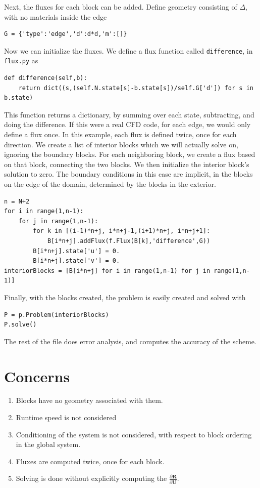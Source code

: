 \documentclass[11pt]{article}
\begin{document}
Next, the fluxes for each block can be added. Define geometry consisting of $\Delta$, with no materials inside the edge
\begin{lstlisting}	
G = {'type':'edge','d':d*d,'m':[]}
\end{lstlisting}
Now we can initialize the fluxes. We define a flux function called \lstinline{difference}, in \lstinline{flux.py} as
\begin{lstlisting}
def difference(self,b):
	return dict((s,(self.N.state[s]-b.state[s])/self.G['d']) for s in b.state)
\end{lstlisting}
This function returns a dictionary, by summing over each state, subtracting, and doing the difference. If this were a real CFD code, for each edge, we would only define a flux once. In this example, each flux is defined twice, once for each direction. We create a list of interior blocks which we will actually solve on, ignoring the boundary blocks. For each neighboring block, we create a flux based on that block, connecting the two blocks. We then initialize the interior block's solution to zero. The boundary conditions in this case are implicit, in the blocks on the edge of the domain, determined by the blocks in the exterior.
\begin{lstlisting}
n = N+2
for i in range(1,n-1):
	for j in range(1,n-1):
		for k in [(i-1)*n+j, i*n+j-1,(i+1)*n+j, i*n+j+1]:
			B[i*n+j].addFlux(f.Flux(B[k],'difference',G))
		B[i*n+j].state['u'] = 0.
		B[i*n+j].state['v'] = 0.
interiorBlocks = [B[i*n+j] for i in range(1,n-1) for j in range(1,n-1)]
\end{lstlisting}
Finally, with the blocks created, the problem is easily created and solved with
\begin{lstlisting}
P = p.Problem(interiorBlocks)
P.solve()
\end{lstlisting}
The rest of the file does error analysis, and computes the accuracy of the scheme.
\section{Concerns}
\begin{enumerate}
\item Blocks have no geometry associated with them.
\item Runtime speed is not considered
\item Conditioning of the system is not considered, with respect to block ordering in the global system.
\item Fluxes are computed twice, once for each block.
\item Solving is done without explicitly computing the $\frac{\partial \mathbf{R}}{\partial \mathbf{U}}$.
\end{enumerate}
\end{document}
